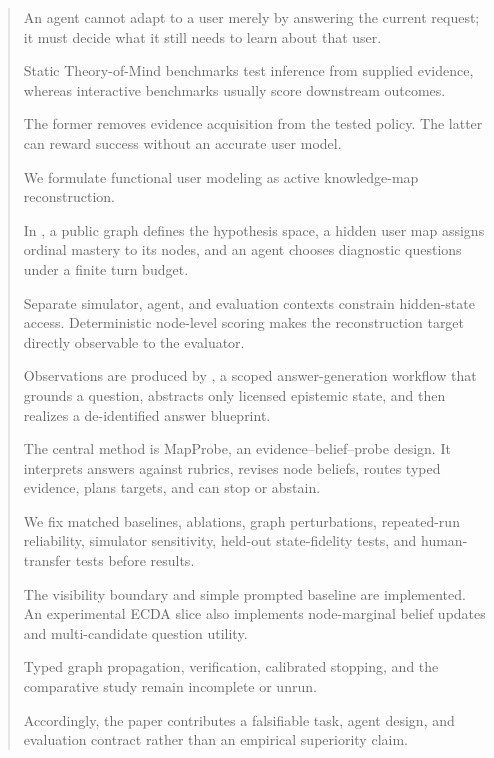 \begin{abstract}
An agent cannot adapt to a user merely by answering the current request; it must decide what it still
needs to learn about that user.

Static Theory-of-Mind benchmarks test inference from supplied evidence, whereas interactive benchmarks
usually score downstream outcomes.

The former removes evidence acquisition from the tested policy. The latter can reward success without
an accurate user model.

We formulate functional user modeling as active knowledge-map reconstruction.

In \knowact, a public graph defines the hypothesis space, a hidden user map assigns ordinal mastery to
its nodes, and an agent chooses diagnostic questions under a finite turn budget.

Separate simulator, agent, and evaluation contexts constrain hidden-state access. Deterministic
node-level scoring makes the reconstruction target directly observable to the evaluator.

Observations are produced by \sagesim, a scoped answer-generation workflow that grounds a question,
abstracts only licensed epistemic state, and then realizes a de-identified answer blueprint.

The central method is MapProbe, an evidence--belief--probe design. It interprets answers against
rubrics, revises node beliefs, routes typed evidence, plans targets, and can stop or abstain.

We fix matched baselines, ablations, graph perturbations, repeated-run reliability, simulator
sensitivity, held-out state-fidelity tests, and human-transfer tests before results.

The visibility boundary and simple prompted baseline are implemented. An experimental ECDA slice also
implements node-marginal belief updates and multi-candidate question utility.

Typed graph propagation, verification, calibrated stopping, and the comparative study remain
incomplete or unrun.

Accordingly, the paper contributes a falsifiable task, agent design, and evaluation contract rather
than an empirical superiority claim.
\end{abstract}
